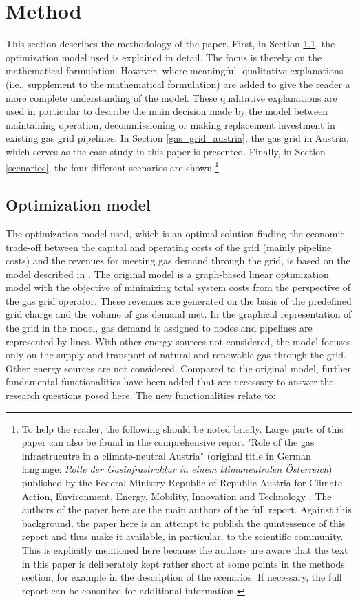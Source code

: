  \section{Method}\label{methodology}
This section describes the methodology of the paper. First, in Section \ref{model}, the optimization model used is explained in detail. The focus is thereby on the mathematical formulation. However, where meaningful, qualitative explanations (i.e., supplement to the mathematical formulation) are added to give the reader a more complete understanding of the model. These qualitative explanations are used in particular to describe the main decision made by the model between maintaining operation, decommissioning or making replacement investment in existing gas grid pipelines. In Section \ref{gas_grid_austria}, the gas grid in Austria, which serves as the case study in this paper is presented. Finally, in Section \ref{scenarios}, the four different scenarios are shown.\footnote{To help the reader, the following should be noted briefly. Large parts of this paper can also be found in the comprehensive report "Role of the gas infrastrucutre in a climate-neutral Austria" (original title in German language: \textit{Rolle der Gasinfrastruktur in einem klimaneutralen Österreich}) published by the Federal Ministry Republic of Republic Austria for Climate Action, Environment, Energy, Mobility, Innovation and Technology \cite{frontier2023}. The authors of the paper here are the main authors of the full report. Against this background, the paper here is an attempt to publish the quintessence of this report and thus make it available, in particular, to the scientific community. This is explicitly mentioned here because the authors are aware that the text in this paper is deliberately kept rather short at some points in the methods section, for example in the description of the scenarios. If necessary, the full report can be consulted for additional information.}

 \subsection{Optimization model}\label{model}
 
The optimization model used, which is an optimal solution finding the economic trade-off between the capital and operating costs of the grid (mainly pipeline costs) and the revenues for meeting gas demand through the grid, is based on the model described in \cite{zwickl2023design}. The original model is a graph-based linear optimization model with the objective of minimizing total system costs from the perspective of the gas grid operator. These revenues are generated on the basis of the predefined grid charge and the volume of gas demand met. In the graphical representation of the grid in the model, gas demand is assigned to nodes and pipelines are represented by lines. With other energy sources not considered, the model focuses only on the supply and transport of natural and renewable gas through the grid. Other energy sources are not considered. Compared to the original model, further fundamental functionalities have been added that are necessary to answer the research questions posed here. The new functionalities relate to:

